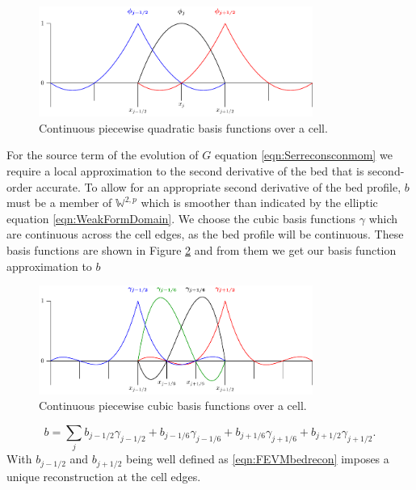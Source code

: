 \begin{figure}
	\centering
	\includegraphics[width=0.8\textwidth]{./chp3/figures/P2.pdf}
	\caption{Continuous piecewise quadratic basis functions over a cell.}
	\label{fig:P2ContBasis}
\end{figure}

For the source term of the evolution of $G$ equation \eqref{eqn:Serreconsconmom} we require a local approximation to the second derivative of the bed that is second-order accurate. To allow for an appropriate second derivative of the bed profile, $b$ must be a member of $\mathbb{W}^{2,p}$ which is smoother than indicated by the elliptic equation \eqref{eqn:WeakFormDomain}. We choose the cubic basis functions $\gamma$ which are continuous across the cell edges, as the bed profile will be continuous. These basis functions are shown in Figure \ref{fig:P3ContBasis} and from them we get our basis function approximation to $b$
\begin{figure}
	\centering
	\includegraphics[width=0.8\textwidth]{./chp3/figures/P3.pdf}
	\caption{Continuous piecewise cubic basis functions over a cell.}
	\label{fig:P3ContBasis}
\end{figure}
\begin{equation}
b = \sum_j b_{j-1/2}\gamma_{j-1/2} + b_{j-1/6}\gamma_{j-1/6}  + b_{j+1/6}\gamma_{j+1/6} + b_{j+1/2}\gamma_{j+1/2}.
\label{eqn:FEapproxtob}
\end{equation}
With $b_{j-1/2}$ and $b_{j+1/2}$ being well defined as \eqref{eqn:FEVMbedrecon} imposes a unique reconstruction at the cell edges. 


